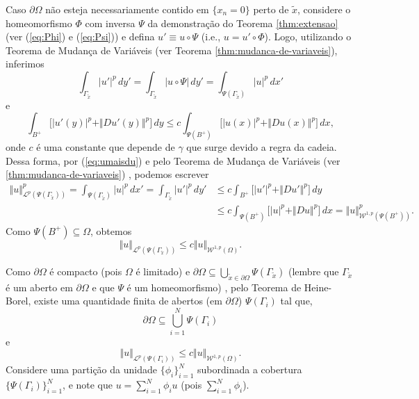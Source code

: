 \documentclass[a4paper, 11pt]{book}
\theoremstyle{definition}
\newcommand{\cL}{\mathcal{L}}
\newcommand{\cW}{\mathcal{W}}
\begin{document}
\begin{prf}
    Caso $\partial \Omega$ não esteja necessariamente contido em $\{x_n =0 \}$ perto de $\tilde x$, considere o homeomorfismo $\Phi$  com inversa $\Psi$ da demonstração do Teorema \ref{thm:extensao} (ver (\ref{eq:Phi}) e (\ref{eq:Psi})) e defina $u' \equiv u \circ \Psi$ (i.e., $u = u' \circ \Phi$). Logo, utilizando o Teorema de Mudança de Variáveis (ver Teorema \ref{thm:mudanca-de-variaveis}), inferimos
    \[
        \int_{\Gamma_{\tilde x}} |u'|^p \,dy' = \int_{\Gamma_{\tilde x}} |u \circ \Psi| \, dy' = \int_{\Psi(\Gamma_{\tilde x})} |u|^p \,dx'
    \]
    e
    \[
        \int_{B^+} \big[ |u'(y)|^p + \Vert Du'(y) \Vert^p \big] \,dy \leqslant c\int_{\Psi(B^+)} \big[ |u(x)|^p + \Vert Du(x) \Vert^p \big] \,dx,
    \]
    onde $c$ é uma constante que depende de $\gamma$ que surge devido a regra da cadeia. Dessa forma, por (\ref{eq:umaisdu}) e pelo Teorema de Mudança de Variáveis (ver \ref{thm:mudanca-de-variaveis}) , podemos escrever
    \[
        \begin{aligned}
            \Vert u \Vert^p_{\cL^p(\Psi(\Gamma_{\tilde x}))} = \int_{\Psi(\Gamma_{\tilde x})} |u|^p \,dx' = \int_{\Gamma_{\tilde x}} |u'|^p \,dy' &\leqslant c\int_{B^+} \big[ |u'|^p + \Vert Du' \Vert^p \big]\,dy\\ 
            &\leqslant c \int_{\Psi(B^+)} \big[ |u|^p + \Vert Du \Vert^p \big] \,dx = \Vert u \Vert_{\cW^{1,p}(\Psi(B^+))}^p.
        \end{aligned}
    \]
    Como $\Psi(B^+) \subseteq \Omega$, obtemos 
    \[
        \Vert u \Vert_{\cL^p(\Psi(\Gamma_{\tilde x}))} \leqslant c \Vert u \Vert_{\cW^{1,p}(\Omega)}.
    \]

    Como $\partial\Omega$ é compacto (pois $\Omega$ é limitado) e $\partial \Omega \subseteq \bigcup_{\tilde x \in \partial \Omega} \Psi(\Gamma_{\tilde x})$ (lembre que $\Gamma_{\tilde x}$ é um aberto em $\partial\Omega$ e que $\Psi$ é um homeomorfismo) , pelo Teorema de Heine-Borel, existe uma quantidade finita de abertos (em $\partial \Omega$) $\Psi(\Gamma_i)$ tal que,
    \[
        \partial\Omega \subseteq \bigcup_{i=1}^N \Psi(\Gamma_i)
    \]
    e
    \begin{equation} \label{eq:1111}
        \Vert u \Vert_{\cL^p(\Psi(\Gamma_i))} \leqslant c \Vert u \Vert_{\cW^{1,p}(\Omega)}.
    \end{equation}
    Considere uma partição da unidade $\{\phi_i\}_{i=1}^N$ subordinada a cobertura $\{\Psi(\Gamma_i)\}_{i=1}^N$, e note que $u = \sum_{i=1}^N \phi_i u$ (pois $\sum_{i=1}^N \phi_i$).


\end{prf}
\end{document}
